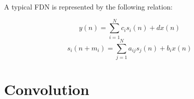 A typical FDN is represented by the following relation:

\begin{defn}\label{def2}
	\begin{equation}\label{nextdef(t)}
	y(n)=\sum_{i=1}^{N} c_i s_i (n) + d x (n)
	\end{equation}
	\begin{equation}
	s_i(n + m_i)=\sum_{j=1}^{N} a_{ij} s_j (n) + b_i x (n)
\end{equation}\end{defn}

\section{Convolution}
